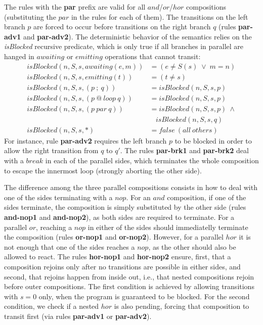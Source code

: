 \documentclass{acm_proc_article-sp}
\newcommand{\rr}[1] {{\textbf{\scriptsize{#1}}}}
\newcommand{\1}{\;}
\newcommand{\2}{\;\;}
\newcommand{\3}{\;\;\;}
\newcommand{\5}{\;\;\;\;\;}
\begin{document}
The rules with the \rr{par} prefix are valid for all $and$/$or$/$hor$ 
compositions (substituting the $par$ in the rules for each of them).
The transitions on the left branch $p$ are forced to occur before transitions 
on the right branch $q$ (rules \rr{par-adv1} and \rr{par-adv2}).
%
The deterministic behavior of the semantics relies on the \emph{isBlocked} 
recursive predicate, which is only true if all branches in parallel are hanged 
in $awaiting$ or $emitting$ operations that cannot transit:
%
{\small
\begin{align*}
  isBlocked(n,S,s, awaiting(e,m)) &= (e \neq S(s) \1\vee\1 m = n)   \\
  isBlocked(n,S,s, emitting(t))   &= (t \neq s)                     \\
  isBlocked(n,S,s, (p~;~q))       &= isBlocked(n,S,s,p)             \\
  isBlocked(n,S,s, (p~@~loop~q))  &= isBlocked(n,S,s,p)             \\
  isBlocked(n,S,s, (p~par~q))     &= isBlocked(n,S,s,p)~\wedge \\
                                     &~~~~isBlocked(n,S,s,q)             \\
  isBlocked(n,S,s, *)             &= false~(all~others)
\end{align*}
}%
%
For instance, rule \rr{par-adv2} requires the left branch $p$ to be blocked in 
order to allow the right transition from $q$ to $q'$.
%
The rules \rr{par-brk1} and \rr{par-brk2} deal with a $break$ in each of the 
parallel sides, which terminates the whole composition to escape the innermost 
loop (strongly aborting the other side).

The difference among the three parallel compositions consists in how to deal 
with one of the sides terminating with a $nop$.
%
For an $and$ composition, if one of the sides terminate, the composition is 
simply substituted by the other side (rules \rr{and-nop1} and \rr{and-nop2}), 
as both sides are required to terminate.
%
For a parallel $or$, reaching a $nop$ in either of the sides should 
immediatelly terminate the composition (rules \rr{or-nop1} and \rr{or-nop2}).
%
However, for a parallel $hor$ it is not enough that one of the sides reaches a 
$nop$, as the other should also be allowed to react.
The rules \rr{hor-nop1} and \rr{hor-nop2} ensure, first, that a composition 
rejoins only after no transitions are possible in either sides, and second, 
that rejoins happen from inside out, i.e., that nested compositions rejoin 
before outer compositions.
The first condition is achieved by allowing transitions with $s=0$ only, when 
the program is guaranteed to be blocked.
For the second condition, we check if a nested $hor$ is also pending, forcing 
that composition to transit first (via rules \textbf{par-adv1} or 
\textbf{par-adv2}).
\end{document}
